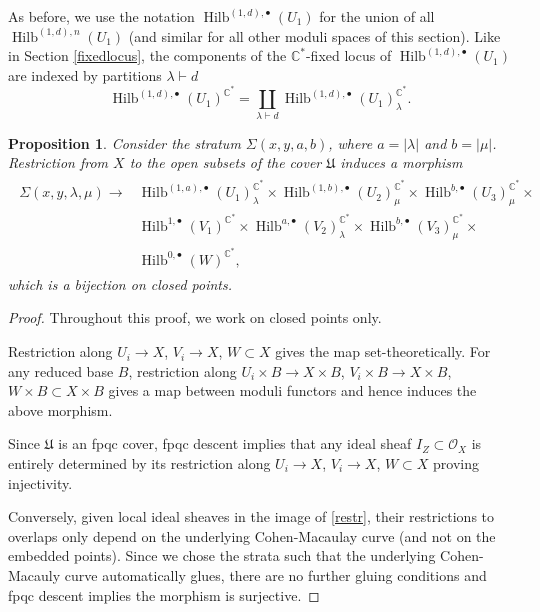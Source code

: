 \documentclass{amsart}
\newtheorem{proposition}[theorem]{Proposition}
\theoremstyle{definition}
\newcommand{\CC} {\mathbb{C}}          %
\renewcommand{\O}{\mathcal{O}}
\newcommand{\Hilb}{\operatorname{Hilb}}
\begin{document}
As before, we use the notation $\Hilb^{(1,d),\bullet}(U_1)$ for the union of all $\Hilb^{(1,d),n}(U_1)$ (and similar for all other moduli spaces of this section). Like in Section \ref{fixedlocus}, the components of the $\CC^*$-fixed locus of $\Hilb^{(1,d),\bullet}(U_1)$ are indexed by partitions $\lambda \vdash d$
$$
\Hilb^{(1,d),\bullet}(U_1)^{\CC^*} = \coprod_{\lambda \vdash d} \Hilb^{(1,d),\bullet}(U_1)_{\lambda}^{\CC^*}.
$$

\begin{proposition} \label{bij}
Consider the stratum $\Sigma(x,y,a,b)$, where $a = |\lambda|$ and $b = |\mu|$. Restriction from $X$ to the open subsets of the cover $\mathfrak{U}$ induces a morphism
\begin{align}
\begin{split} \label{restr}
\Sigma(x,y,\lambda,\mu) \longrightarrow &\Hilb^{(1,a),\bullet}(U_1)_{\lambda}^{\CC^*} \times \Hilb^{(1,b),\bullet}(U_2)_{\mu}^{\CC^*} \times \Hilb^{b,\bullet}(U_3)_{\mu}^{\CC^*} \times \\
&\Hilb^{1,\bullet}(V_1)^{\CC^*} \times \Hilb^{a,\bullet}(V_2)_{\lambda}^{\CC^*} \times \Hilb^{b,\bullet}(V_3)_{\mu}^{\CC^*} \times \\
&\Hilb^{0,\bullet}(W)^{\CC^*},
\end{split}
\end{align}
which is a bijection on closed points.
\end{proposition}
\begin{proof}
Throughout this proof, we work on closed points only.

Restriction along $U_i \rightarrow X$, $V_i \longrightarrow X$, $W \subset X$ gives the map set-theoretically. For any reduced base $B$, restriction along $U_i \times B \rightarrow X \times B$, $V_i \times B \longrightarrow X \times B$, $W \times B \subset X \times B$ gives a map between moduli functors and hence induces the above morphism.

Since $\mathfrak{U}$ is an fpqc cover, fpqc descent implies that any ideal sheaf $I_Z \subset \O_X$ is entirely determined by its restriction along $U_i \rightarrow X$, $V_i \longrightarrow X$, $W \subset X$ proving injectivity.

Conversely, given local ideal sheaves in the image of \eqref{restr}, their restrictions to overlaps only depend on the underlying Cohen-Macaulay curve (and not on the embedded points). Since we chose the strata such that the underlying Cohen-Macauly curve automatically glues, there are no further gluing conditions and fpqc descent implies the morphism is surjective.
\end{proof}
   
\end{document}
